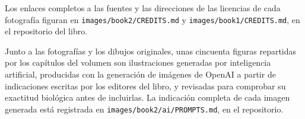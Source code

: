Los enlaces completos a las fuentes y las direcciones de las licencias
de cada fotografía figuran en \texttt{images/\allowbreak book2/\allowbreak CREDITS.md} y
\texttt{images/\allowbreak book1/\allowbreak CREDITS.md}, en el repositorio del libro.

\bigskip
Junto a las fotografías y los dibujos originales, unas cincuenta
figuras repartidas por los capítulos del volumen son ilustraciones
generadas por inteligencia artificial, producidas con la generación de
imágenes de OpenAI a partir de indicaciones escritas por los editores
del libro, y revisadas para comprobar su exactitud biológica antes de
incluirlas. La indicación completa de cada imagen generada está
registrada en \texttt{images/\allowbreak book2/\allowbreak ai/\allowbreak PROMPTS.md}, en el repositorio.
\par\endgroup
\clearpage

